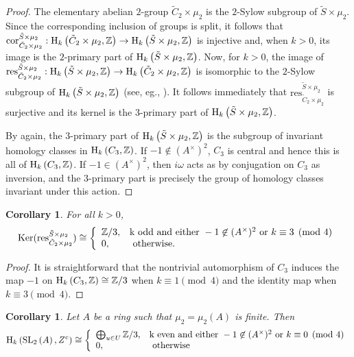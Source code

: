 \documentclass[12pt]{amsart}
\newtheorem{cor}[lem]{Corollary}
\theoremstyle{definition}
\newcommand{\Z}{\Bbb{Z}}
\newcommand{\spl}[2]{\operatorname{SL}_{#1}\left(#2\right)}
\newcommand{\<}{\langle}
\renewcommand{\>}{\rangle}
\renewcommand{\ker}[1]{\mathrm{Ker}(#1)}
\newcommand{\ho}[3]{\mathrm{H}_{#1}\left( #2,#3 \right)}
\newcommand{\Cor}[2]{\mathrm{cor}_{#1}^{#2}}
\newcommand{\Res}[2]{\mathrm{res}_{#1}^{#2}}
\begin{document}
\begin{proof} 
The elementary abelian $2$-group $\tilde{C}_2\times \mu_2$ is the $2$-Sylow subgroup of  $\tilde{S}\times \mu_2$. Since the corresponding inclusion of groups is split, it follows that 
$\Cor{\tilde{C}_2\times\mu_2}{\tilde{S}\times \mu_2}:\ho{k}{\tilde{C}_2\times\mu_2}{\Z}\to\ho{k}{\tilde{S}\times \mu_2}{\Z}$ is injective and, when $k>0$,  its image is the $2$-primary part of 
$\ho{k}{\tilde{S}\times \mu_2}{\Z}$. Now, for $k>0$,  the image of $\Res{\tilde{C}_2\times\mu_2}{\tilde{S}\times \mu_2}:\ho{k}{\tilde{S}\times \mu_2}{\Z}\to\ho{k}{\tilde{C}_2\times\mu_2}{\Z}$
is isomorphic to the $2$-Sylow subgroup of $\ho{k}{\tilde{S}\times \mu_2}{\Z}$ (see, eg., \cite[Theorem III.10.3]{brown:coh}).
It follows immediately that $\Res{\tilde{C}_2\times\mu_2}{\tilde{S}\times\mu_2}$ is surjective and its kernel is the $3$-primary part of $\ho{k}{\tilde{S}\times\mu_2}{\Z}$.

By \cite[Theorem III.10.3]{brown:coh} again, the $3$-primary part of $\ho{k}{\tilde{S}\times\mu_2}{\Z}$ is the subgroup of invariant homology classes in $\ho{k}{C_3}{\Z}$. If $-1\not\in (A^\times)^2$,
$C_3$ is central and hence this is all of $\ho{k}{C_3}{\Z}$. If $-1\in (A^\times)^2$, then $i\omega$ acts as by conjugation on $C_3$ as inversion, and the $3$-primary part is precisely the 
group of homology classes invariant under this action. 
\end{proof}
\begin{cor}\label{cor:kerres} For all $k>0$,
\[
\ker{\Res{\tilde{C}_2\times\mu_2}{\tilde{S}\times\mu_2}}\cong 
\left\{
\begin{array}{ll}
\Z/3,&  $k$\mbox{ odd and either } -1\not\in (A^\times)^2 \mbox{ or } k\equiv 3\pmod{4}\\
0,& \mbox{ otherwise.}\\
\end{array}
\right.
\]
\end{cor}
\begin{proof} It is straightforward  that the nontrivial automorphism of $C_3$ induces the map $-1$ on $\ho{k}{C_3}{\Z}\cong \Z/3$ when $k\equiv 1\pmod{4}$ and the identity map when 
$k\equiv 3\pmod{4}$. 
\end{proof}


\begin{cor}\label{cor:hksl2zc}  Let $A$ be a ring such that $\mu_2=\mu_2(A)$ is finite. Then
\[
\ho{k}{\spl{2}{A}}{Z^c}\cong
\left\{
\begin{array}{ll}
\bigoplus_{u\in U}\Z/3,&  $k$\mbox{ even and either } -1\not\in (A^\times)^2 \mbox{ or } k\equiv 0\pmod{4}\\
0,&\mbox{ otherwise}
\end{array}
\right.
\]
\end{cor}
\end{document}
